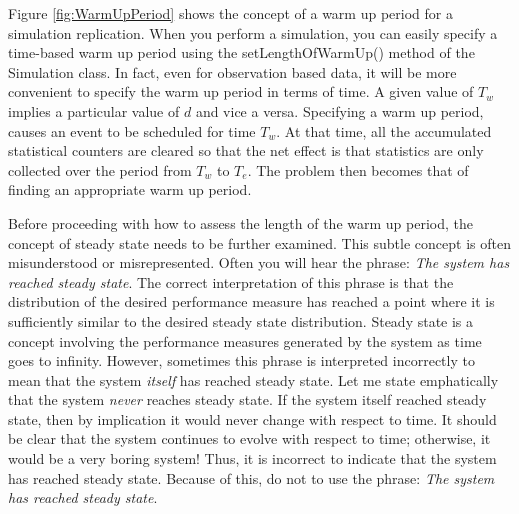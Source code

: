 \documentclass[
]{book}
\theoremstyle{definition}
\theoremstyle{definition}
\theoremstyle{definition}
\theoremstyle{definition}
\theoremstyle{remark}
\begin{document}
Figure \ref{fig:WarmUpPeriod} shows the concept of a warm up period for a
simulation replication. When you perform a simulation, you can easily
specify a time-based warm up period using the setLengthOfWarmUp() method
of the Simulation class. In fact, even for observation based data, it
will be more convenient to specify the warm up period in terms of time.
A given value of \(T_w\) implies a particular value of \(d\) and vice a
versa. Specifying a warm up period, causes an event to be scheduled for
time \(T_w\). At that time, all the accumulated statistical counters are
cleared so that the net effect is that statistics are only collected
over the period from \(T_w\) to \(T_e\). The problem then becomes that of
finding an appropriate warm up period.

Before proceeding with how to assess the length of the warm up period,
the concept of steady state needs to be further examined. This subtle
concept is often misunderstood or misrepresented. Often you will hear
the phrase: \emph{The system has reached steady state}. The correct
interpretation of this phrase is that the distribution of the desired
performance measure has reached a point where it is sufficiently similar
to the desired steady state distribution. Steady state is a concept
involving the performance measures generated by the system as time goes
to infinity. However, sometimes this phrase is interpreted incorrectly
to mean that the system \emph{itself} has reached steady state. Let me state
emphatically that the system \emph{never} reaches steady state. If the system
itself reached steady state, then by implication it would never change
with respect to time. It should be clear that the system continues to
evolve with respect to time; otherwise, it would be a very boring
system! Thus, it is incorrect to indicate that the system has reached
steady state. Because of this, do not to use the phrase: \emph{The system has
reached steady state}.
\end{document}
